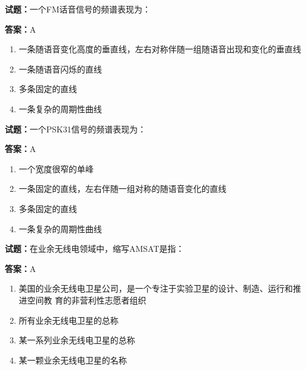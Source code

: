 \documentclass{ctexbook}
\begin{document}




\vspace{1em}

\textbf{试题：}一个FM话音信号的频谱表现为： 

\textbf{答案：}A 

\begin{enumerate}[leftmargin=3em]
  \item 一条随语音变化高度的垂直线，左右对称伴随一组随语音出现和变化的垂直线 

  \item 一条随语音闪烁的直线 


  \item 多条固定的直线 

  \item 一条复杂的周期性曲线 

\end{enumerate}





\vspace{1em}

\textbf{试题：}一个PSK31信号的频谱表现为： 

\textbf{答案：}A 

\begin{enumerate}[leftmargin=3em]
  \item 一个宽度很窄的单峰 

  \item 一条固定的直线，左右伴随一组对称的随语音变化的直线 

  \item 多条固定的直线 

  \item 一条复杂的周期性曲线 

\end{enumerate}





\vspace{1em}

\textbf{试题：}在业余无线电领域中，缩写AMSAT是指： 

\textbf{答案：}A 

\begin{enumerate}[leftmargin=3em]
  \item 美国的业余无线电卫星公司，是一个专注于实验卫星的设计、制造、运行和推进空间教
育的非营利性志愿者组织 

  \item 所有业余无线电卫星的总称 

  \item 某一系列业余无线电卫星的总称 

  \item 某一颗业余无线电卫星的名称 

\end{enumerate}
\end{document}
